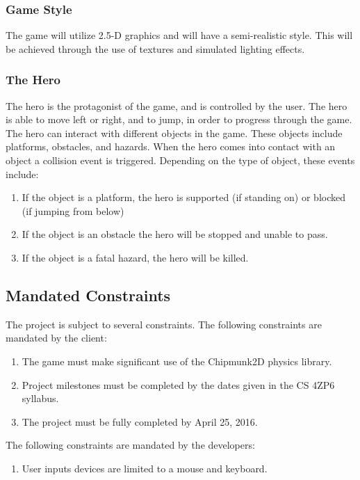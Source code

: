 \documentclass[12pt, titlepage]{article}
\begin{document}
\subsubsection{Game Style}
The game will utilize 2.5-D graphics and will have a semi-realistic style.  This will be achieved through the use of textures and simulated lighting effects.

\subsubsection{The Hero}
The hero is the protagonist of the game, and is controlled by the user.  The hero is able to move left or right, and to jump, in order to progress through the game.  The hero can interact with different objects in the game.  These objects include platforms, obstacles, and hazards.  When the hero comes into contact with an object a collision event is triggered.  Depending on the type of object, these events include:

\begin{enumerate}
  \item If the object is a platform, the hero is supported (if standing on) or blocked (if jumping from below)
  \item If the object is an obstacle the hero will be stopped and unable to pass.
  \item If the object is a fatal hazard, the hero will be killed.
\end{enumerate}



\subsection{Mandated Constraints}

The project is subject to several constraints.  The following constraints are mandated by the client:

\begin{enumerate}
  \item The game must make significant use of the Chipmunk2D physics library.
  \item Project milestones must be completed by the dates given in the CS 4ZP6 syllabus.
  \item The project must be fully completed by April 25, 2016.
\end{enumerate}

The following constraints are mandated by the developers:

\begin{enumerate}
  \item User inputs devices are limited to a mouse and keyboard.
\end{enumerate}
\end{document}
